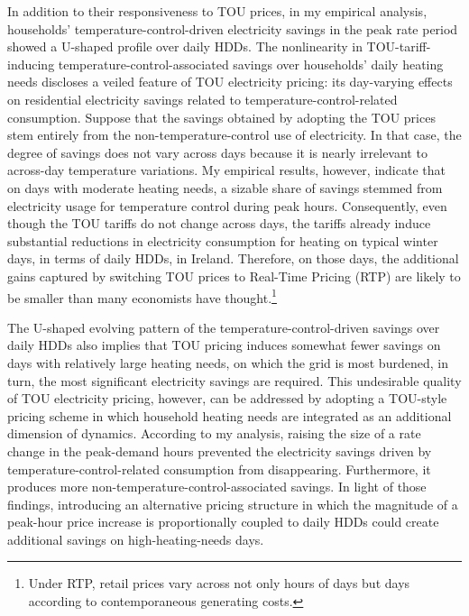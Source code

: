 In addition to their responsiveness to TOU prices, in my empirical analysis, households' temperature-control-driven electricity savings in the peak rate period showed a U-shaped profile over daily HDDs. The nonlinearity in TOU-tariff-inducing temperature-control-associated savings over households' daily heating needs discloses a veiled feature of TOU electricity pricing: its day-varying effects on residential electricity savings related to temperature-control-related consumption. Suppose that the savings obtained by adopting the TOU prices stem entirely from the non-temperature-control use of electricity. In that case, the degree of savings does not vary across days because it is nearly irrelevant to across-day temperature variations. My empirical results, however, indicate that on days with moderate heating needs, a sizable share of savings stemmed from electricity usage for temperature control during peak hours. Consequently, even though the TOU tariffs do not change across days, the tariffs already induce substantial reductions in electricity consumption for heating on typical winter days, in terms of daily HDDs, in Ireland. Therefore, on those days, the additional gains captured by switching TOU prices to Real-Time Pricing (RTP) are likely to be smaller than many economists have thought.\footnote{Under RTP, retail prices vary across not only hours of days but days according to contemporaneous generating costs.} 

The U-shaped evolving pattern of the temperature-control-driven savings over daily HDDs also implies that TOU pricing induces somewhat fewer savings on days with relatively large heating needs, on which the grid is most burdened, in turn, the most significant electricity savings are required. This undesirable quality of TOU electricity pricing, however, can be addressed by adopting a TOU-style pricing scheme in which household heating needs are integrated as an additional dimension of dynamics. According to my analysis, raising the size of a rate change in the peak-demand hours prevented the electricity savings driven by temperature-control-related consumption from disappearing. Furthermore, it produces more non-temperature-control-associated savings. In light of those findings, introducing an alternative pricing structure in which the magnitude of a peak-hour price increase is proportionally coupled to daily HDDs could create additional savings on high-heating-needs days.  

